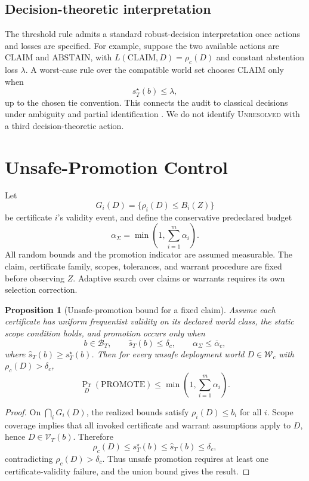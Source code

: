 \documentclass[10pt]{article}
\newtheorem{proposition}[definition]{Proposition}
\newcommand{\Wc}{\mathcal W_c}
\newcommand{\Vk}{\mathcal V_T}
\newcommand{\BT}{\mathcal B_T}
\newcommand{\riskc}{\rho_c}
\begin{document}
\subsection{Decision-theoretic interpretation}

The threshold rule admits a standard robust-decision interpretation once
actions and losses are specified.  For example, suppose the two available
actions are \(\mathrm{CLAIM}\) and \(\mathrm{ABSTAIN}\), with
\(L(\mathrm{CLAIM},D)=\riskc(D)\) and constant abstention loss \(\lambda\).
A worst-case rule over the compatible world set chooses
\(\mathrm{CLAIM}\) only when
\[
s_T^\star(b)\le \lambda,
\]
up to the chosen tie convention.  This connects the audit to classical
decisions under ambiguity and partial identification
\citep{GilboaSchmeidler1989,Manski2000}.  We do not identify
\textsc{Unresolved} with a third decision-theoretic action.

\section{Unsafe-Promotion Control}

Let
\[
G_i(D)=\{\rho_i(D)\le B_i(Z)\}
\]
be certificate \(i\)'s validity event, and define the conservative
predeclared budget
\[
\alpha_\Sigma
=
\min\!\left(1,\sum_{i=1}^{m}\alpha_i\right).
\]
All random bounds and the promotion indicator are assumed measurable.  The
claim, certificate family, scopes, tolerances, and warrant procedure are fixed
before observing \(Z\).  Adaptive search over claims or warrants requires its
own selection correction.

\begin{proposition}[Unsafe-promotion bound for a fixed claim]
Assume each certificate has uniform frequentist validity on its declared world
class, the static scope condition holds, and promotion occurs only when
\[
b\in\BT,\qquad
\widehat s_T(b)\le\delta_c,\qquad
\alpha_\Sigma\le\bar\alpha_c,
\]
where \(\widehat s_T(b)\ge s_T^\star(b)\).  Then for every unsafe
deployment world \(D\in\Wc\) with \(\riskc(D)>\delta_c\),
\[
\boxed{
\Pr_D(\mathrm{PROMOTE})
\le
\min\!\left(1,\sum_{i=1}^{m}\alpha_i\right).
}
\]
\end{proposition}

\begin{proof}
On \(\bigcap_i G_i(D)\), the realized bounds satisfy
\(\rho_i(D)\le b_i\) for all \(i\).  Scope coverage implies that all
invoked certificate and warrant assumptions apply to \(D\), hence
\(D\in\Vk(b)\). Therefore
\[
\riskc(D)
\le
s_T^\star(b)
\le
\widehat s_T(b)
\le
\delta_c,
\]
contradicting \(\riskc(D)>\delta_c\).  Thus unsafe promotion requires at
least one certificate-validity failure, and the union bound gives the result.
\end{proof}
\end{document}
